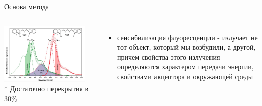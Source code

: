 \documentclass[9pt, compress, xcolor=table]{beamer}
\begin{document}
\begin{frame}{Основа метода}
\begin{columns}[c]
\column{6.5cm}
\begin{center}
\includegraphics[width=0.9\textwidth]{nfm29}
\\* Достаточно перекрытия в 30$\%$
\end{center}

\begin{itemize}
\item \colorbox{yellow!30}{сенсибилизация флуоресценции} - излучает не тот объект, который мы возбудили, а другой, причем свойства этого излучения определяются характером передачи энергии, свойствами акцептора и окружающей среды

\end{itemize}


\end{columns}
\end{frame}
\end{document}
